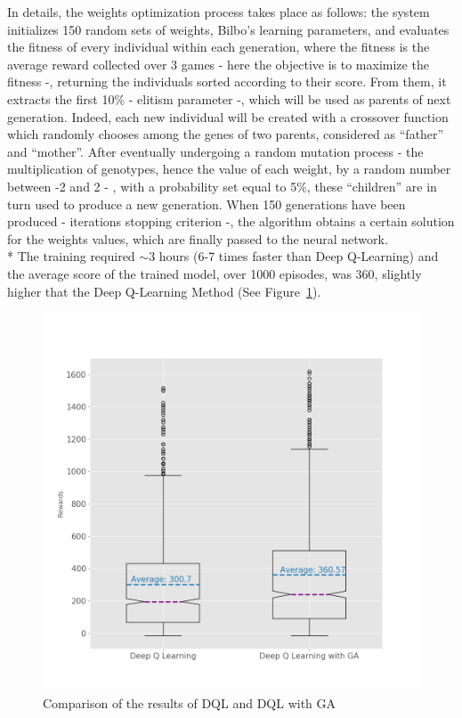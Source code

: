 In details, the weights optimization process takes place as follows: the system initializes 150 random sets of weights, Bilbo's learning parameters, and evaluates the fitness of every individual within each generation, where the fitness is the average reward collected over 3 games - here the objective is to maximize the fitness -, returning the individuals sorted according to their score. From them, it extracts the first 10\% - elitism parameter -, which will be used as parents of next generation. Indeed, each new individual will be created with a crossover function which randomly chooses among the genes of two parents, considered as ``father'' and ``mother''. After eventually undergoing a random mutation process - the multiplication of genotypes, hence the value of each weight, by a random number between -2 and 2 - , with a probability set equal to 5\%, these ``children'' are in turn used to produce a new generation. When 150 generations have been produced - iterations stopping criterion -, the algorithm obtains a certain solution for the weights values, which are finally passed to the neural network. \\*
The training required $\sim$3 hours (6-7 times faster than Deep Q-Learning) and the average score of the trained model, over 1000 episodes, was 360, slightly higher that the Deep Q-Learning Method (See Figure~\ref{fig:deep_vs_ga}).

\begin{figure}[!h]
	\vspace{-2cm}
	\includegraphics[width=\linewidth]{./figs/deep_vs_ga.png}
	\vspace{-1.5cm}
	\caption{Comparison of the results of DQL and DQL with GA}
	\label{fig:deep_vs_ga}
	\vspace{-1cm}
\end{figure}

